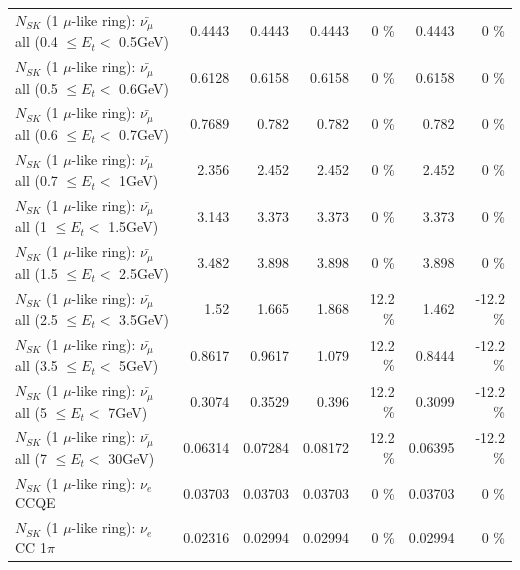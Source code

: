 \begin{table}
\begin{tabular}{| l | r | r | r  r | r  r |}
 $N_{SK}$ (1 $\mu$-like ring): $\bar{\nu_{\mu}}$ all (0.4 $\leq E_{t} <$ 0.5GeV) &          0.4443 &          0.4443 &          0.4443 &        0 \%  &          0.4443 &        0 \%  \\ 
 $N_{SK}$ (1 $\mu$-like ring): $\bar{\nu_{\mu}}$ all (0.5 $\leq E_{t} <$ 0.6GeV) &          0.6128 &          0.6158 &          0.6158 &        0 \%  &          0.6158 &        0 \%  \\ 
 $N_{SK}$ (1 $\mu$-like ring): $\bar{\nu_{\mu}}$ all (0.6 $\leq E_{t} <$ 0.7GeV) &          0.7689 &           0.782 &           0.782 &        0 \%  &           0.782 &        0 \%  \\ 
   $N_{SK}$ (1 $\mu$-like ring): $\bar{\nu_{\mu}}$ all (0.7 $\leq E_{t} <$ 1GeV) &           2.356 &           2.452 &           2.452 &        0 \%  &           2.452 &        0 \%  \\ 
   $N_{SK}$ (1 $\mu$-like ring): $\bar{\nu_{\mu}}$ all (1 $\leq E_{t} <$ 1.5GeV) &           3.143 &           3.373 &           3.373 &        0 \%  &           3.373 &        0 \%  \\ 
 $N_{SK}$ (1 $\mu$-like ring): $\bar{\nu_{\mu}}$ all (1.5 $\leq E_{t} <$ 2.5GeV) &           3.482 &           3.898 &           3.898 &        0 \%  &           3.898 &        0 \%  \\ 
 $N_{SK}$ (1 $\mu$-like ring): $\bar{\nu_{\mu}}$ all (2.5 $\leq E_{t} <$ 3.5GeV) &            1.52 &           1.665 &           1.868 &     12.2 \%  &           1.462 &    -12.2 \%  \\ 
   $N_{SK}$ (1 $\mu$-like ring): $\bar{\nu_{\mu}}$ all (3.5 $\leq E_{t} <$ 5GeV) &          0.8617 &          0.9617 &           1.079 &     12.2 \%  &          0.8444 &    -12.2 \%  \\ 
     $N_{SK}$ (1 $\mu$-like ring): $\bar{\nu_{\mu}}$ all (5 $\leq E_{t} <$ 7GeV) &          0.3074 &          0.3529 &           0.396 &     12.2 \%  &          0.3099 &    -12.2 \%  \\ 
    $N_{SK}$ (1 $\mu$-like ring): $\bar{\nu_{\mu}}$ all (7 $\leq E_{t} <$ 30GeV) &         0.06314 &         0.07284 &         0.08172 &     12.2 \%  &         0.06395 &    -12.2 \%  \\ 
\hline
\hline
\hline
                                      $N_{SK}$ (1 $\mu$-like ring): $\nu_e$ CCQE &         0.03703 &         0.03703 &         0.03703 &        0 \%  &         0.03703 &        0 \%  \\ 
                                 $N_{SK}$ (1 $\mu$-like ring): $\nu_e$ CC 1$\pi$ &         0.02316 &         0.02994 &         0.02994 &        0 \%  &         0.02994 &        0 \%  \\ 

\end{tabular}
\end{table}
